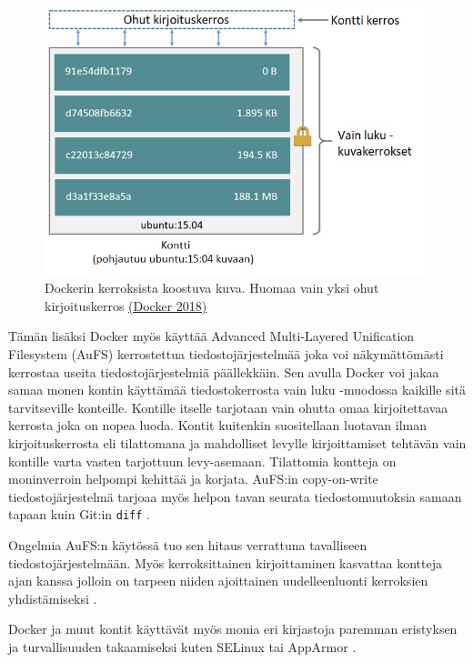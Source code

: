 \documentclass[finnish]{tktltiki2}
\theoremstyle{definition}
\theoremstyle{remark}
\begin{document}
\begin{figure}[h]
    \centering
    \includegraphics[width=1\textwidth]{images/container-layers.jpg}
    \caption{Dockerin kerroksista koostuva kuva. Huomaa vain yksi ohut kirjoituskerros \href{https://docs.docker.com/storage/storagedriver/\#images-and-layers}{(Docker 2018)}}
    \label{fig:container-layers}
\end{figure}

Tämän lisäksi Docker myös käyttää Advanced Multi-Layered Unification Filesystem (AuFS) kerrostettua tiedostojärjestelmää joka voi näkymättömästi kerrostaa useita tiedostojärjestelmiä päällekkäin. Sen avulla Docker voi jakaa samaa monen kontin käyttämää tiedostokerrosta vain luku -muodossa kaikille sitä tarvitseville konteille. Kontille itselle tarjotaan vain ohutta omaa kirjoitettavaa kerrosta joka on nopea luoda. Kontit kuitenkin suositellaan luotavan ilman kirjoituskerrosta eli tilattomana ja mahdolliset levylle kirjoittamiset tehtävän vain kontille varta vasten tarjottuun levy-asemaan. Tilattomia kontteja on moninverroin helpompi kehittää ja korjata. AuFS:in copy-on-write tiedostojärjestelmä tarjoaa myös helpon tavan seurata tiedostomuutoksia samaan tapaan kuin Git:in \texttt{diff} \cite{docker}.

Ongelmia AuFS:n käytössä tuo sen hitaus verrattuna tavalliseen tiedostojärjestelmään. Myös kerroksittainen kirjoittaminen kasvattaa kontteja ajan kanssa jolloin on tarpeen niiden ajoittainen uudelleenluonti kerroksien yhdistämiseksi \cite{containers-in-multi-user-environments}.

Docker ja muut kontit käyttävät myös monia eri kirjastoja paremman eristyksen ja turvallisuuden takaamiseksi kuten SELinux tai AppArmor \cite{practical-container}.
\end{document}
